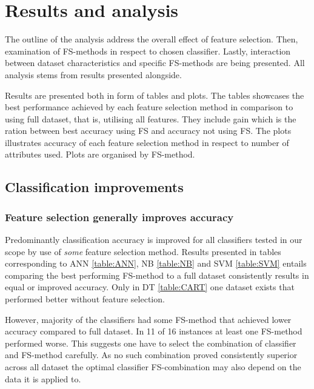 \chapter{Results and analysis}

The outline of the analysis address the overall effect of feature selection. Then, examination of FS-methods in respect to chosen classifier. Lastly, interaction between dataset characteristics and specific FS-methods are being presented. All analysis stems from results presented alongside.

Results are presented both in form of tables and plots. The tables showcases the best performance achieved by each feature selection method in comparison to using full dataset, that is, utilising all features. They include gain which is the ration between best accuracy using FS and accuracy not using FS. The plots illustrates accuracy of each feature selection method in respect to number of attributes used. Plots are organised by FS-method.


\section{Classification improvements}

\subsection{Feature selection generally improves accuracy}

Predominantly classification accuracy is improved for all classifiers tested in our scope by use of \textit{some} feature selection method. Results presented in tables corresponding to ANN \ref{table:ANN}, NB \ref{table:NB} and SVM \ref{table:SVM} entails comparing the best performing FS-method to a full dataset consistently results in equal or improved accuracy. Only in DT \ref{table:CART} one dataset exists that performed better without feature selection.

However, majority of the classifiers had some FS-method that achieved lower accuracy compared to full dataset. In 11 of 16 instances at least one FS-method performed worse. This suggests one have to select the combination of classifier and FS-method carefully. As no such combination proved consistently superior across all dataset the optimal classifier FS-combination may also depend on the data it is applied to.

\begin{table}[h]
  
  \caption[]%
  {{\small Classification accuracy achieved by ANN was improved on all datasets by the use of some feature selection method.}}
  \label{table:ANN}
\end{table}

